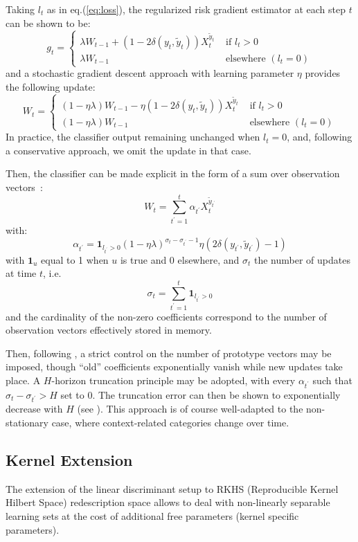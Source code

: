 \documentclass[preprint,12pt,authoryear]{elsarticle}
\begin{document}
Taking $l_t$ as in eq.(\ref{eq:loss}), the regularized risk gradient estimator at each step $t$ can be shown to be:
$$g_t = \left\{
\begin{array}{ll}
\lambda W_{t-1} + (1 - 2 \delta(y_t,\tilde{y}_t)) X_t^{\tilde{y}_t} &\text{ if } l_t > 0\\
\lambda W_{t-1} &\text{ elsewhere }(l_t=0)
\end{array}
\right.$$
and a stochastic gradient descent approach with learning parameter $\eta$ provides the following update:
$$W_t =  \left\{
\begin{array}{ll}
(1-\eta\lambda) W_{t-1} - \eta (1 - 2 \delta(y_t,\tilde{y}_t)) X_t^{\tilde{y}_t} &\text{ if } l_t > 0\\
(1-\eta\lambda) W_{t-1} &\text{ elsewhere }(l_t = 0)
\end{array}
\right.$$
In practice, the classifier output remaining unchanged when $l_t = 0$, and, following a conservative approach, we omit the update in that case. 

Then, the classifier can be made explicit in the form of a sum over observation vectors~:
$$W_t = \sum_{t^\prime=1}^t \alpha_{t^\prime} X_t^{\tilde{y}_{t^\prime}}$$
with:
$$\alpha_{t^\prime} = \mathbf{1}_{l_{t^\prime} > 0}(1 - \eta \lambda)^{\sigma_t - \sigma_{t^\prime}-1}  \eta (2\delta(y_{t^\prime},\tilde{y}_{t^\prime})-1)$$
with $\mathbf{1}_u$ equal to 1 when $u$ is true and 0 elsewhere, and $\sigma_t$  the number of updates at time $t$, i.e.
$$\sigma_t = \sum_{t^\prime=1}^t \mathbf{1}_{l_{t^\prime} > 0}$$  
and the cardinality of the non-zero coefficients correspond to the number of observation vectors effectively stored in memory.

Then, following \cite{kivinen2004online}, a strict control on the number of prototype vectors may be imposed, though ``old'' coefficients exponentially vanish while new updates take place. A $H$-horizon truncation principle may be adopted, with every $\alpha_{t^\prime}$ such that $\sigma_t - \sigma_{t^\prime} > H$ set to 0. The truncation error can then be shown to  exponentially decrease with $H$ (see \cite{kivinen2004online}). This approach is of course well-adapted to the non-stationary case, where context-related categories change over time.




\subsection{Kernel Extension}
The extension of the linear discriminant setup to 
RKHS (Reproducible Kernel Hilbert Space) redescription space 
allows to deal with non-linearly separable learning sets at the cost of additional free parameters (kernel specific parameters). 
\end{document}
